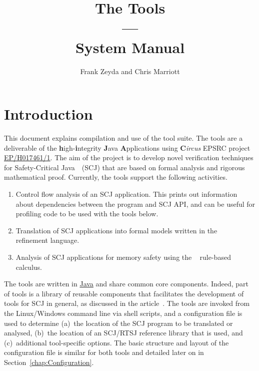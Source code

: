 \documentclass{report}
\title{The {\hiJAC} Tools\\---\\System Manual}
\author{Frank Zeyda and Chris Marriott}
\begin{document}
\maketitle

\tableofcontents

\newcommand{\email}[1]{\href{mailto:#1}{\texttt{#1}}}


\chapter{Introduction}
\label{chap:Introduction}

This document explains compilation and use of the {\hiJAC} tool suite. The {\hiJAC} tools are a deliverable of the \textbf{h}igh-\textbf{i}ntegrity \textbf{J}ava \textbf{A}pplications using {\textsf{\textbf{C}{\slshape ircus}}} EPSRC project \href{http://gow.epsrc.ac.uk/NGBOViewGrant.aspx?GrantRef=EP/H017461/1}{EP/H017461/1}. The aim of the project is to develop novel verification techniques for Safety-Critical Java~\cite{JSR302}~(SCJ) that are based on formal analysis and rigorous mathematical proof. Currently, the tools support the following activities.
%
\begin{enumerate}
  \item Control flow analysis of an SCJ application. This prints out information about dependencies between the program and SCJ API, and can be useful for profiling code to be used with the tools below.

  \item Translation of SCJ applications into formal models written in the {\Circus}~\cite{ZLCW13} refinement language.

  \item Analysis of SCJ applications for memory safety using the {\mSafe}~\cite{MC14} rule-based calculus.
\end{enumerate}
%
The tools are written in \href{http://www.oracle.com/technetwork/java/index.html}{Java} and share common core components. Indeed, part of {\hiJAC} tools is a library of reusable components that facilitates the development of tools for SCJ in general, as discussed in the article~\cite{ZLCW13}. The tools are invoked from the Linux/Windows command line via shell scripts, and a configuration file is used to determine (a)~the location of the SCJ program to be translated or analysed, (b)~the location of an SCJ/RTSJ reference library that is used, and (c)~additional tool-specific options. The basic structure and layout of the configuration file is similar for both tools and detailed later on in Section~\ref{chap:Configuration}.
\end{document}

